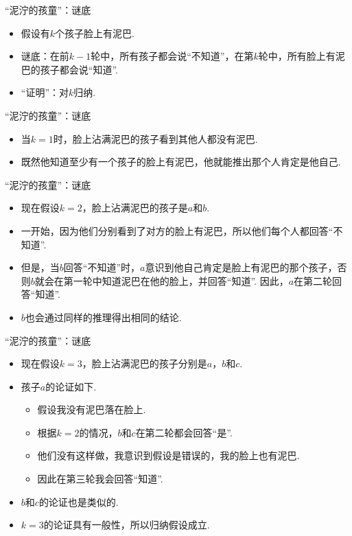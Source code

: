 \begin{frame}{“泥泞的孩童”：谜底}
\begin{itemize}
    \item 假设有$k$个孩子脸上有泥巴.
    \item 谜底：在前$k-1$轮中，所有孩子都会说“不知道”，在第$k$轮中，所有脸上有泥巴的孩子都会说“知道”.
    \item “证明”：对$k$归纳.
\end{itemize}
\end{frame}

\begin{frame}{“泥泞的孩童”：谜底}
\begin{itemize}
    \item 当$k=1$时，脸上沾满泥巴的孩子看到其他人都没有泥巴. 
    \item 既然他知道至少有一个孩子的脸上有泥巴，他就能推出那个人肯定是他自己. 
\end{itemize}
\end{frame}


\begin{frame}{“泥泞的孩童”：谜底}
\begin{itemize}
    \item 现在假设$k=2$，脸上沾满泥巴的孩子是$a$和$b$. 
    \item 一开始，因为他们分别看到了对方的脸上有泥巴，所以他们每个人都回答“不知道”. 
    \item 但是，当$b$回答“不知道”时，$a$意识到他自己肯定是脸上有泥巴的那个孩子，否则$b$就会在第一轮中知道泥巴在他的脸上，并回答“知道”. 因此，$a$在第二轮回答“知道”. 
    \item $b$也会通过同样的推理得出相同的结论. 
\end{itemize}
\end{frame}

\begin{frame}{“泥泞的孩童”：谜底}
\begin{itemize}
    \item 现在假设$k=3$，脸上沾满泥巴的孩子分别是$a$，$b$和$c$. 
    \item 孩子$a$的论证如下. 
    \begin{itemize}
        \item 假设我没有泥巴落在脸上. 
        \item 根据$k=2$的情况，$b$和$c$在第二轮都会回答“是”. 
        \item 他们没有这样做，我意识到假设是错误的，我的脸上也有泥巴.
        \item 因此在第三轮我会回答“知道”. 
    \end{itemize}
    \item $b$和$c$的论证也是类似的.
    \item $k=3$的论证具有一般性，所以归纳假设成立.
\end{itemize}
\end{frame}

